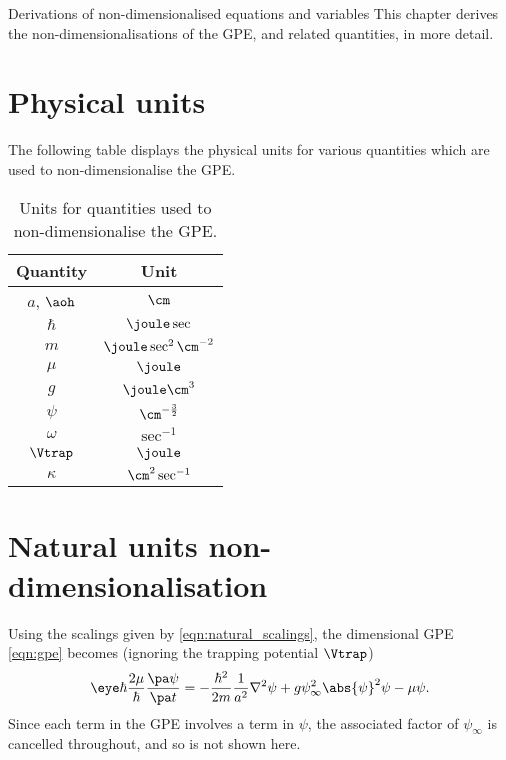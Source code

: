 
\begin{chapter}{\label{cha:nondim}Derivations of non-dimensionalised equations
and variables}
  This chapter derives the non-dimensionalisations of the GPE, and related
  quantities, in more detail.

  \section{Physical units}
  The following table displays the physical units for various quantities which
  are used to non-dimensionalise the GPE.
  \begin{table}[h]
    \centering
    \begin{tabular}{cc}
      \hline
      Quantity & Unit \\
      \hline
      $a$, $\aoh$ & $\cm$ \\
      $\hbar$     & $\joule\sec$ \\
      $m$         & $\joule\sec^{2}\cm^{-2}$ \\
      $\mu$       & $\joule$ \\
      $g$         & $\joule\cm^{3}$ \\
      $\psi$      & $\cm^{-\frac{3}{2}}$ \\
      $\omega$    & $\sec^{-1}$ \\
      $\Vtrap$    & $\joule$ \\
      $\kappa$    & $\cm^{2}\sec^{-1}$ \\
      \hline\hline
    \end{tabular}
    \caption{Units for quantities used to non-dimensionalise the GPE.}
  \end{table}
  
  \section{Natural units non-dimensionalisation}
  Using the scalings given by \eqref{eqn:natural_scalings}, the dimensional GPE
  \eqref{eqn:gpe} becomes (ignoring the trapping potential $\Vtrap$)
  \begin{equation*}
    \eye \hbar \frac{2\mu}{\hbar} \frac{\pa \psi}{\pa t} =
    -\frac{\hbar^{2}}{2m} \frac{1}{a^{2}} \nabla^{2} \psi + g \psi_{\infty}^{2}
    \abs{\psi}^{2} \psi - \mu \psi.
  \end{equation*}
  Since each term in the GPE involves a term in $\psi$, the associated factor
  of $\psi_{\infty}$ is cancelled throughout, and so is not shown here.
  

\end{chapter}
